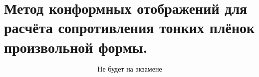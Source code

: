 \section{Метод конформных отображений для расчёта сопротивления тонких
плёнок произвольной формы.}
 
\[\boxed{\text{Не будет на экзамене}}
\]


